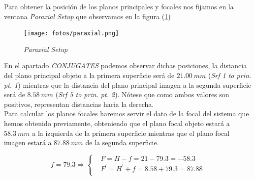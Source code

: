 \documentclass[11pt]{article}
\begin{document}
        \noindent Para obtener la posición de los planos principales y focales nos fijamos en la ventana \textit{Paraxial Setup} que observamos en la figura (\ref{fig:paraxial_setup})

        \begin{figure}[ht]
            \centering
            \texttt{[image: fotos/paraxial.png]}
            \caption{\textit{Paraxial Setup}}
            \label{fig:paraxial_setup}
        \end{figure}

        \noindent En el apartado \textit{CONJUGATES} podemos observar dichas posiciones, la distancia del plano principal objeto a la primera superficie será de $21.00\ mm$ (\textit{Srf 1 to prin. pt. 1}) mientras que la distancia del plano principal imagen a la segunda superficie será de $8.58\ mm$ (\textit{Srf 5 to prin. pt. 2}). Nótese que como ambos valores son positivos, representan distancias hacia la derecha.\\

        \noindent Para calcular los planos focales haremos servir el dato de la focal del sistema que hemos obtenido previamente, obteniendo que el plano focal objeto estará a $58.3\ mm$ a la izquierda de la primera superficie mientras que el plano focal imagen estará a $87.88\ mm$ de la segunda superficie.

        \[
        f=79.3 \Longrightarrow 
        \left\{\begin{aligned}
            &F=H-f=21-79.3=-58.3\\
            &F^\prime=H^\prime+f=8.58+79.3=87.88\\
        \end{aligned}\right.
        \]
\end{document}
